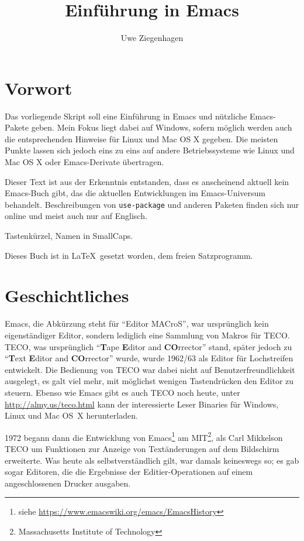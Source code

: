 \documentclass[12pt,ngerman]{scrbook}
\title{Einführung in Emacs}
\author{Uwe Ziegenhagen}
\begin{document}
\maketitle

\frontmatter

\tableofcontents


\chapter*{Vorwort}

Das vorliegende Skript soll eine Einführung in Emacs und nützliche Emacs-Pakete geben. Mein Fokus liegt dabei auf Windows, sofern möglich werden auch die entsprechenden Hinweise für Linux und Mac OS X gegeben. Die meisten Punkte lassen sich jedoch eins zu eins auf andere Betriebssysteme wie Linux und Mac OS X oder Emacs-Derivate übertragen. 

Dieser Text ist aus der Erkenntnis entstanden, dass es anscheinend aktuell kein Emacs-Buch gibt, das die aktuellen Entwicklungen im Emacs-Universum behandelt. Beschreibungen von \texttt{use-package} und anderen Paketen finden sich nur online und meist auch nur auf Englisch. 

Tastenkürzel, Namen in SmallCaps.

Dieses Buch ist in \LaTeX\ gesetzt worden, dem freien Satzprogramm. 

\mainmatter

\chapter{Geschichtliches}

Emacs, die Abkürzung steht für \enquote{Editor MACroS}, war ursprünglich kein eigenständiger Editor, sondern lediglich eine Sammlung von Makros für TECO. TECO, was ursprünglich \enquote{\textbf{T}ape \textbf{E}ditor and \textbf{CO}rrector} stand, später jedoch zu \enquote{\textbf{T}ext \textbf{E}ditor and \textbf{CO}rrector} wurde, wurde 1962/63 als Editor für Lochstreifen entwickelt. Die Bedienung von TECO war dabei nicht auf Benutzerfreundlichkeit ausgelegt, es galt viel mehr, mit möglichst wenigen Tastendrücken den Editor zu steuern. Ebenso wie Emacs gibt es auch TECO noch heute, unter \url{http://almy.us/teco.html} kann der interessierte Leser Binaries für Windows, Linux und Mac OS~X herunterladen. 

1972 begann dann die Entwicklung von Emacs\footnote{siehe \url{https://www.emacswiki.org/emacs/EmacsHistory}} am MIT\footnote{Massachusetts Institute of Technology}, als Carl Mikkelson TECO um Funktionen zur Anzeige von Textänderungen auf dem Bildschirm erweiterte. Was heute als selbstverständlich gilt, war damals keineswegs so; es gab sogar Editoren, die die Ergebnisse der Editier-Operationen auf einem angeschlossenen Drucker ausgaben.
\end{document}
